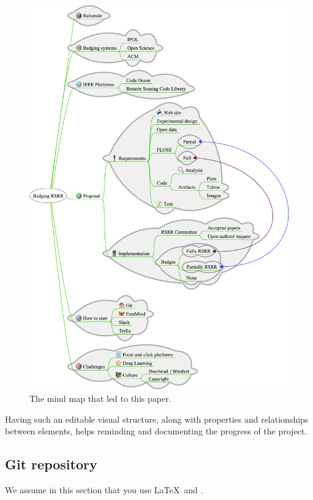 \documentclass[journal,twoside]{IEEEtran}
\begin{document}
\begin{figure}[hbt]
\centering
\includegraphics[width=\linewidth]{"Badging RSRR.pdf"}
\caption{The mind map that led to this paper.}\label{Fig:Doodle}
\end{figure}

Having such an editable visual structure, along with properties and relationships between elements, helps reminding and documenting the progress of the project.

\subsection{Git repository}

We assume in this section that you use \LaTeX\ and \BibTeX.
\end{document}
